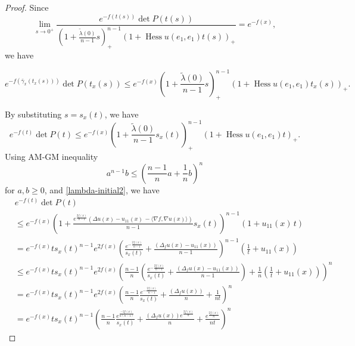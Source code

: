 \documentclass[psamsfonts]{amsart}
\theoremstyle{definition}
\theoremstyle{remark}
\numberwithin{equation}{section}
\begin{document}
\begin{proof}
Since
$$\lim_{s\to 0^+} \frac{e^{-f(t(s))}\det P(t(s))}{\left( 1+ \frac{\tilde \lambda (0)}{n-1} s\right)^{n-1}_+ \left( 1+ \operatorname{Hess} u (e_1,e_1) t(s)\right)_+} = e^{-f(x)},$$
we have 

\[
e^{-f(\bar \gamma_x(t_x(s)))}\det P(t_x(s))
\le e^{-f(x)}
\left( 1+ \frac{\tilde \lambda (0)}{n-1} s\right)^{n-1}_+ \left( 1+ \operatorname{Hess} u (e_1,e_1) t_x(s)\right)_+.
\]

By substituting $s = s_x(t)$, we have
$$e^{-f(t)}\det P(t) \leq e^{-f(x)}\left( 1+ \frac{\tilde \lambda (0)}{n-1} s_x(t)\right)^{n-1}_+ \left( 1+ \operatorname{Hess} u (e_1,e_1) t\right)_+.$$
Using AM-GM inequality \begin{equation}
    a^{n-1}b \leq \left(\frac{n-1}{n}a + \frac{1}{n}b\right)^{n} \label{AMGM-inequality}
\end{equation}
for $a ,b\geq 0$,
and \eqref{lambda-initial2},  we have 
{\small
\begin{align*}
    &e^{-f(t)}\det P(t) \\
    &\leq e^{-f(x)}\left( 1+ \frac{e^{\frac{2f(x)}{n-1}}(\Delta u (x) -u_{11}(x)\, -\langle \nabla f, \nabla u(x)\rangle)}{n-1} s_x(t)\right)^{n-1} \left( 1+ u_{11}(x)\, t\right)\\
    & = e^{-f(x)}ts_x(t)^{n-1}e^{2f(x)}\left( \frac{e^{-\frac{2f(x)}{n-1}}}{s_x(t)}+ \frac{(\Delta_f u (x) -u_{11}(x) )}{n-1} \right)^{n-1} \left( \frac{1}{t}+ u_{11}(x) \right)\\
    &\leq e^{-f(x)}ts_x(t)^{n-1}e^{2f(x)}
    \left(\frac{n-1}{n} \left(\frac{e^{-\frac{2f(x)}{n-1}}}{s_x(t)}+ \frac{(\Delta_f u (x) -u_{11}(x) )}{n-1} \right) + \frac{1}{n} \left(\frac{1}{t}+ u_{11}(x) \right)\right)^n\\
    &= e^{-f(x)}ts_x(t)^{n-1}e^{2f(x)}
    \left(\frac{n-1}{n} \frac{e^{-\frac{2f(x)}{n-1}}}{s_x(t)}+ \frac{(\Delta_f u (x)  )}{n} +  \frac{1}{nt}\right)^n\\
    & = e^{-f(x)}ts_x(t)^{n-1} \left( \frac{n-1}{n} \frac{e^{\frac{-2f(x)}{n(n-1)}}}{s_x(t)} + \frac{(\Delta_f u(x)) e^{\frac{2f(x)}{n}}}{n} + \frac{e^{\frac{2f(x)}{n}}}{nt}\right)^n

\end{align*}}
\end{proof}
\end{document}
